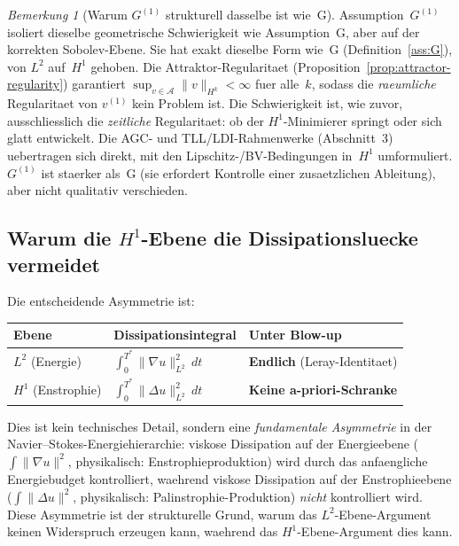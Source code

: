 \documentclass[12pt,a4paper]{article}
\theoremstyle{definition}
\theoremstyle{plain}
\theoremstyle{remark}
\newtheorem{remark}[definition]{Bemerkung}
\begin{document}
\begin{remark}[Warum $G^{(1)}$ strukturell dasselbe ist wie~G]
Assumption~$G^{(1)}$ isoliert dieselbe geometrische Schwierigkeit wie
Assumption~G, aber auf der korrekten Sobolev-Ebene.
Sie hat exakt dieselbe Form wie~G
(Definition~\ref{ass:G}), von $L^2$ auf~$H^1$ gehoben. Die
Attraktor-Regularitaet
(Proposition~\ref{prop:attractor-regularity}) garantiert
$\sup_{v \in \mathcal{A}}\|v\|_{H^k} < \infty$ fuer alle~$k$,
sodass die \emph{raeumliche} Regularitaet von $v^{(1)}$ kein Problem ist.
Die Schwierigkeit ist, wie zuvor, ausschliesslich die \emph{zeitliche}
Regularitaet: ob der $H^1$-Minimierer springt oder sich glatt entwickelt.
Die AGC- und TLL/LDI-Rahmenwerke (Abschnitt~3) uebertragen sich direkt, mit
den Lipschitz-/BV-Bedingungen in~$H^1$ umformuliert.
$G^{(1)}$ ist staerker als~G (sie erfordert Kontrolle einer
zusaetzlichen Ableitung), aber nicht qualitativ verschieden.
\end{remark}

\subsection{Warum die $H^1$-Ebene die Dissipationsluecke vermeidet}

Die entscheidende Asymmetrie ist:

\begin{center}
\begin{tabular}{lll}
\hline
\textbf{Ebene} & \textbf{Dissipationsintegral} & \textbf{Unter Blow-up} \\
\hline
$L^2$\; (Energie)
  & $\int_0^{T^*}\|\nabla u\|_{L^2}^2\,dt$
  & \textbf{Endlich} (Leray-Identitaet) \\
$H^1$\; (Enstrophie)
  & $\int_0^{T^*}\|\Delta u\|_{L^2}^2\,dt$
  & \textbf{Keine a-priori-Schranke} \\
\hline
\end{tabular}
\end{center}

\noindent
Dies ist kein technisches Detail, sondern eine \emph{fundamentale Asymmetrie}
in der Navier--Stokes-Energiehierarchie: viskose Dissipation auf der
Energieebene ($\int\|\nabla u\|^2$, physikalisch: Enstrophieproduktion)
wird durch das anfaengliche Energiebudget kontrolliert, waehrend viskose Dissipation
auf der Enstrophieebene ($\int\|\Delta u\|^2$, physikalisch: Palinstrophie-Produktion) \emph{nicht} kontrolliert wird. Diese Asymmetrie ist der strukturelle Grund,
warum das $L^2$-Ebene-Argument keinen Widerspruch erzeugen kann, waehrend das
$H^1$-Ebene-Argument dies kann.
\end{document}
